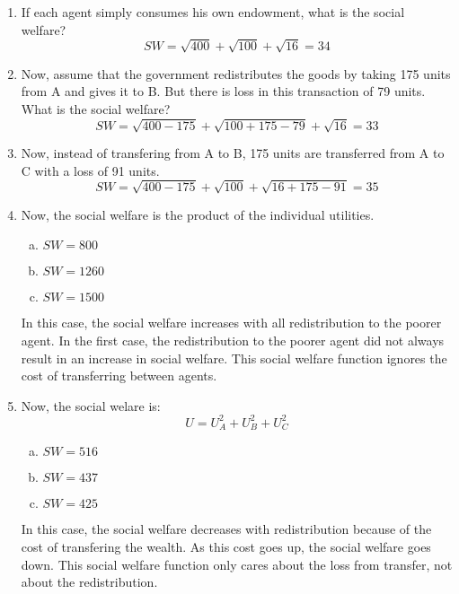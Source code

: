 \documentclass{article}
\begin{document}
\begin{enumerate}[1.]
    \item If each agent simply consumes his own endowment, what is the social
        welfare?
        $$ SW = \sqrt{ 400 } + \sqrt{ 100 } + \sqrt{ 16 } = 34 $$

    \item Now, assume that the government redistributes the goods by taking 175
        units from A and gives it to B. But there is loss in this transaction of
        79 units. What is the social welfare?
        $$ SW = \sqrt{ 400 - 175 } + \sqrt{ 100 + 175 - 79 } + \sqrt{ 16 } = 33 $$

    \item Now, instead of transfering from A to B, 175 units are transferred
        from A to C with a loss of 91 units.
        $$ SW = \sqrt{ 400 - 175 } + \sqrt{ 100 } + \sqrt{ 16 + 175 - 91 } = 35 $$

    \item Now, the social welfare is the product of the individual utilities.
        \begin{enumerate}[a.]
            \item $SW = 800$
            \item $SW = 1260$
            \item $SW = 1500$
        \end{enumerate}

        In this case, the social welfare increases with all redistribution to
        the poorer agent. In the first case, the redistribution to the poorer
        agent did not always result in an increase in social welfare. This
        social welfare function ignores the cost of transferring between agents.

    \item Now, the social welare is:
        $$ U = U_{A}^{2} + U_{B}^{2} + U_{C}^{2} $$
        \begin{enumerate}[a.]
            \item $SW = 516$
            \item $SW = 437$
            \item $SW = 425$
        \end{enumerate}

        In this case, the social welfare decreases with redistribution because
        of the cost of transfering the wealth. As this cost goes up, the social
        welfare goes down. This social welfare function only cares about the
        loss from transfer, not about the redistribution.
        

\end{enumerate}
\end{document}
